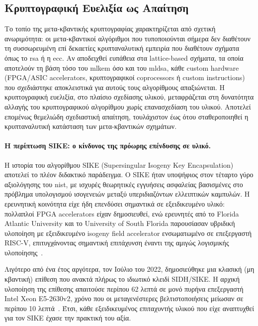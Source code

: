 \subsection{Κρυπτογραφική Ευελιξία ως Απαίτηση}
\label{ssec:agility-requirement}

Το τοπίο της μετα-κβαντικής κρυπτογραφίας χαρακτηρίζεται από σχετική ανωριμότητα: οι
μετα-κβαντικοί αλγόριθμοι που τυποποιούνται σήμερα δεν διαθέτουν τη συσσωρευμένη επί δεκαετίες κρυπταναλυτική
εμπειρία που διαθέτουν σχήματα όπως το \gls{rsa} ή η \gls{ecc}. Αν
αποδειχθεί ευπάθεια στα lattice-based σχήματα, τα οποία αποτελούν τη βάση τόσο
του \gls{mlkem} όσο και του \gls{mldsa}, κάθε custom hardware (FPGA/ASIC accelerators, κρυπτογραφικοί
coprocessors ή custom instructions) που σχεδιάστηκε αποκλειστικά για αυτούς τους
αλγορίθμους απαξιώνεται. Η κρυπτογραφική ευελιξία, στο πλαίσιο σχεδίασης υλικού, μεταφράζεται στη
δυνατότητα αλλαγής του κρυπτογραφικού αλγορίθμου χωρίς επανασχεδίαση του
υλικού. Αποτελεί επομένως θεμελιώδη σχεδιαστική απαίτηση, τουλάχιστον έως ότου
σταθεροποιηθεί η κρυπταναλυτική κατάσταση των μετα-κβαντικών σχημάτων.

\paragraph{Η περίπτωση SIKE: ο κίνδυνος της πρόωρης επένδυσης σε υλικό.}
Η ιστορία του αλγορίθμου SIKE (Supersingular Isogeny Key Encapsulation)
αποτελεί το πλέον διδακτικό παράδειγμα. Ο SIKE ήταν υποψήφιος στον τέταρτο
γύρο αξιολόγησης του \gls{nist}, με ισχυρές θεωρητικές εγγυήσεις ασφαλείας
βασισμένες στο πρόβλημα υπολογισμού ισογενειών μεταξύ υπεριδιαζόντων ελλειπτικών
καμπυλών. Η ερευνητική κοινότητα είχε ήδη επενδύσει σημαντικά σε εξειδικευμένο
υλικό: πολλαπλοί FPGA accelerators είχαν δημοσιευθεί, ενώ ερευνητές από το
Florida Atlantic University και το University of South Florida παρουσίασαν
υβριδική υλοποίηση με εξειδικευμένο isogeny field accelerator ενσωματωμένο σε
επεξεργαστή RISC-V, επιτυγχάνοντας σημαντική επιτάχυνση έναντι της αμιγώς λογισμικής υλοποίησης~\cite{Elkhatib2021-SIKE-RISCV}.

Λιγότερο από ένα έτος αργότερα, τον Ιούλιο του 2022, δημοσιεύθηκε μια κλασική (μη κβαντική) επίθεση που ανακτά πλήρως το ιδιωτικό
κλειδί SIDH/SIKE. Η αρχική υλοποίηση της επίθεσης απαιτούσε περίπου
\num{62} λεπτά σε μονό πυρήνα επεξεργαστή Intel Xeon E5-2630v2, χρόνο που οι
μεταγενέστερες βελτιστοποιήσεις μείωσαν σε περίπου \num{10}
λεπτά~\cite{Castryck2022-SIKE-attack}. Έτσι, κάθε εξειδικευμένος επιταχυντής υλικού που είχε αναπτυχθεί για τον SIKE έχασε
την πρακτική του αξία.

